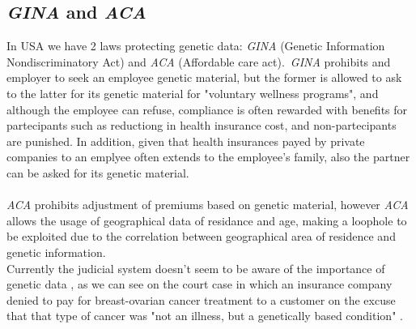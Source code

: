 \documentclass[12pt]{article}
\begin{document}
\subsection{\emph{GINA} and \emph{ACA}}
In USA we have 2 laws protecting genetic data: \emph{GINA} (Genetic Information Nondiscriminatory Act) and \emph{ACA} (Affordable care act).\
\emph{GINA} prohibits and employer to seek an employee genetic material, but the former is allowed to ask to the latter for its genetic material for "voluntary wellness programs", 
and although the employee can refuse, compliance is often rewarded with benefits for partecipants such as reductiong in health insurance cost, and non-partecipants are punished. \cite{genetic_data_misuse} 
In addition, given that health insurances payed by private companies to an emplyee often extends to the employee's family, also the partner can be asked for its genetic material.\\
\\
\emph{ACA} prohibits adjustment of premiums based on genetic material, however \emph{ACA} allows the usage of geographical data of residance and age, 
making a loophole to be exploited due to the correlation between geographical area of residence and genetic information. \cite{geographic_genetic_correlations}\\
Currently the judicial system doesn't seem to be aware of the importance of genetic data \cite{genetic_literacy}, 
as we can see on the court case in which an insurance company denied to pay for breast-ovarian cancer treatment to a customer on the excuse that that type of cancer was "not an illness, 
but a genetically based condition" \cite{genetic_data_misuse}.
\end{document}
